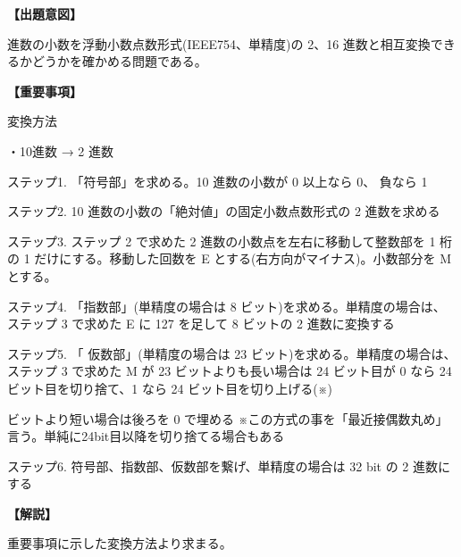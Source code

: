\noindent \textbf{【出題意図】}

 進数の小数を浮動小数点数形式(IEEE754、単精度)の 2、16 進数と相互変換できるかどうかを確かめる問題である。

\vspace{1em}
\noindent \textbf{【重要事項】}

\noindent 変換方法

\medskip
\noindent ・10進数 → 2 進数

\medskip
\noindent ステップ1. 「符号部」を求める。10 進数の小数が 0 以上なら 0、 負なら 1 

\noindent ステップ2.  10 進数の小数の「絶対値」の固定小数点数形式の 2 進数を求める 

\noindent ステップ3.  ステップ 2 で求めた 2 進数の小数点を左右に移動して整数部を 1 桁の 1 だけにする。移動した回数を E とする(右方向がマイナス)。小数部分を M とする。

\noindent ステップ4.  「指数部」(単精度の場合は 8 ビット)を求める。単精度の場合は、ステップ 3 で求めた E に 127 を足して 8 ビットの 2 進数に変換する

\noindent ステップ5. 「 仮数部」(単精度の場合は 23 ビット)を求める。単精度の場合は、ステップ 3 で求めた M が 23 ビットよりも長い場合は 24 ビット目が 0 なら 24 ビット目を切り捨て、1 なら 24 ビット目を切り上げる(※)

 ビットより短い場合は後ろを 0 で埋める ※この方式の事を「最近接偶数丸め」言う。単純に24bit目以降を切り捨てる場合もある 

\noindent ステップ6.  符号部、指数部、仮数部を繋げ、単精度の場合は 32 bit の 2 進数にする


\vspace{1em}
\noindent \textbf{【解説】}

\noindent 重要事項に示した変換方法より求まる。
